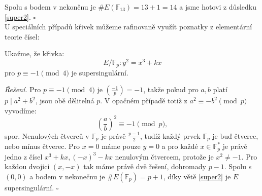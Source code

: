 \documentclass[12pt]{report}
\begin{document}
Spolu s bodem v nekončnu je $\# E(\mathbb{F}_{13})=13+1=14$ a jsme hotovi z důsledku \ref{super2}. \hfill $\square$\\

U speciálních případů křivek můžeme rafinovaně využít poznatky z elementární teorie čísel:

\begin{priklad}
Ukažme, že křivka:
 $$E/\mathbb{F}_p : y^2 = x^3 + kx$$
pro $ p \equiv -1 \pmod{4}$ je supersingulární.
\end{priklad}
\noindent \textit{Řešení.} Pro $p \equiv -1 \pmod{4}$ je $\genfrac{(}{)}{}{}{-1}{p} = -1$, takže pokud pro $a,b$ platí $p \mid a^2 + b^2$, jsou obě dělitelná $p$. V opačném případě totiž z $a^2 \equiv -b^2 \pmod{p}$ vyvodíme:
\begin{equation*}
\left(\frac{a}{b}\right)^2 \equiv -1 \pmod{p},
\end{equation*} 
spor. Nenulových čtverců v $\mathbb{F}_p$ je právě $\frac{p-1}{2}$, tudíž každý prvek $\mathbb{F}_p$ je buď čtverec, nebo mínus čtverec. Pro $x= 0$ máme pouze $y = 0$ a pro každé $x \in \mathbb{F}_p^*$ je právě jedno z čísel $x^3+kx, (-x)^3-kx$ nenulovým čtvercem, protože je $x^2 \neq -1$. Pro každou dvojici $(x,-x)$ tak máme právě dvě řešení, dohromady $p-1$. Spolu s $(0,0)$ a bodem v nekonečnu je $\# E(\mathbb{F}_p) = p+1$, díky větě \ref{super2} je $E$ supersingulární. \hfill $\square$\\
\end{document}
